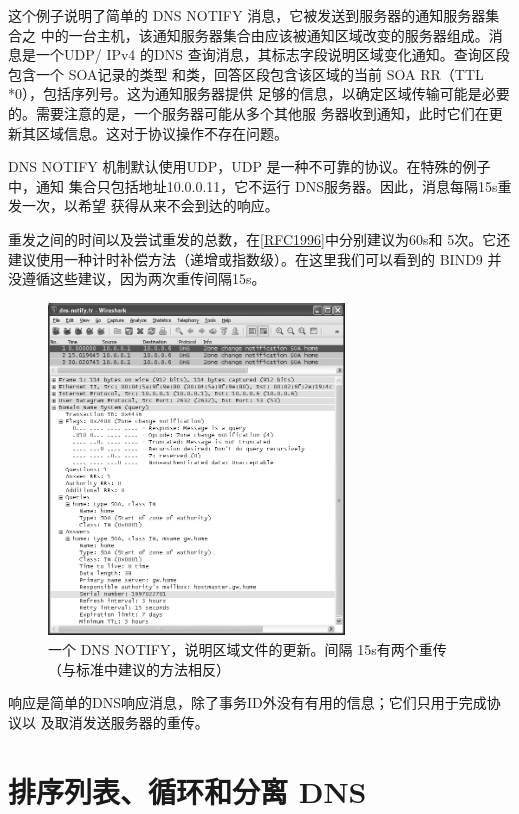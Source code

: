 这个例子说明了简单的 DNS NOTIFY 消息，它被发送到服务器的通知服务器集合之
中的一台主机，该通知服务器集合由应该被通知区域改变的服务器组成。消息是一个UDP/
IPv4 的DNS 查询消息，其标志字段说明区域变化通知。查询区段包含一个 SOA记录的类型
和类，回答区段包含该区域的当前 SOA RR（TTL *0），包括序列号。这为通知服务器提供
足够的信息，以确定区域传输可能是必要的。需要注意的是，一个服务器可能从多个其他服
务器收到通知，此时它们在更新其区域信息。这对于协议操作不存在问题。

DNS NOTIFY 机制默认使用UDP，UDP 是一种不可靠的协议。在特殊的例子中，通知
集合只包括地址10.0.0.11，它不运行 DNS服务器。因此，消息每隔15s重发一次，以希望
获得从来不会到达的响应。

\begin{tcolorbox}
  重发之间的时间以及尝试重发的总数，在\href{https://www.rfc-editor.org/rfc/rfc1996}{[RFC1996]}中分别建议为60s和
  5次。它还建议使用一种计时补偿方法（递增或指数级）。在这里我们可以看到的
  BIND9 并没遵循这些建议，因为两次重传间隔15s。
\end{tcolorbox}

\begin{figure}[!htb]
  \centering
  \includegraphics[width=0.7\textwidth]{imgs/11/11-23.png}
  \caption{一个 DNS NOTIFY，说明区域文件的更新。间隔 15s有两个重传（与标准中建议的方法相反）}
\end{figure}

响应是简单的DNS响应消息，除了事务ID外没有有用的信息；它们只用于完成协议以
及取消发送服务器的重传。

\section{排序列表、循环和分离 DNS}

